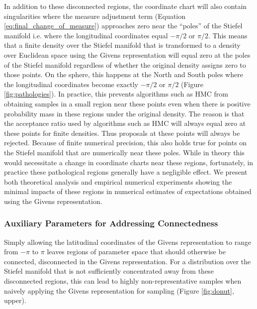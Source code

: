 \documentclass[ba]{imsart}
\numberwithin{equation}{section}
\theoremstyle{plain}
\begin{document}
\noindent In addition to these disconnected regions, the coordinate chart will also contain singularities where the measure adjustment term (Equation \ref{eq:final_change_of_measure}) approaches zero near the ``poles'' of the Stiefel manifold i.e. where the longitudinal coordinates equal $-\pi/2$ or $\pi/2$. This means that a finite density over the Stiefel manifold that is transformed to a density over Euclidean space using the Givens representation will equal zero at the poles of the Stiefel manifold regardless of whether the original density assigns zero to those points. On the sphere, this happens at the North and South poles where the longitudinal coordinates become exactly $-\pi/2$ or $\pi/2$ (Figure \ref{fig:pathologies}). In practice, this prevents algorithms such as HMC from obtaining samples in a small region near these points even when there is positive probability mass in these regions under the original density. The reason is that the acceptance ratio used by algorithms such as HMC will always equal zero at these points for finite densities. Thus proposals at these points will always be rejected. Because of finite numerical precision, this also holds true for points on the Stiefel manifold that are numerically near these poles. While in theory this would necessitate a change in coordinate charts near these regions, fortunately, in practice these pathological regions generally have a negligible effect. We present both theoretical analysis and empirical numerical experiments showing the minimal impacts of these regions in numerical estimates of expectations obtained using the Givens representation.

\subsubsection{Auxiliary Parameters for Addressing Connectedness}
\noindent  Simply allowing the latitudinal coordinates of the Givens representation to range from $-\pi$ to $\pi$ leaves regions of parameter space that should otherwise be connected, disconnected in the Givens representation. For a distribution over the Stiefel manifold that is not sufficiently concentrated away from these disconnected regions, this can lead to highly non-representative samples when naively applying the Givens representation for sampling (Figure \ref{fig:donut}, upper).
\end{document}
